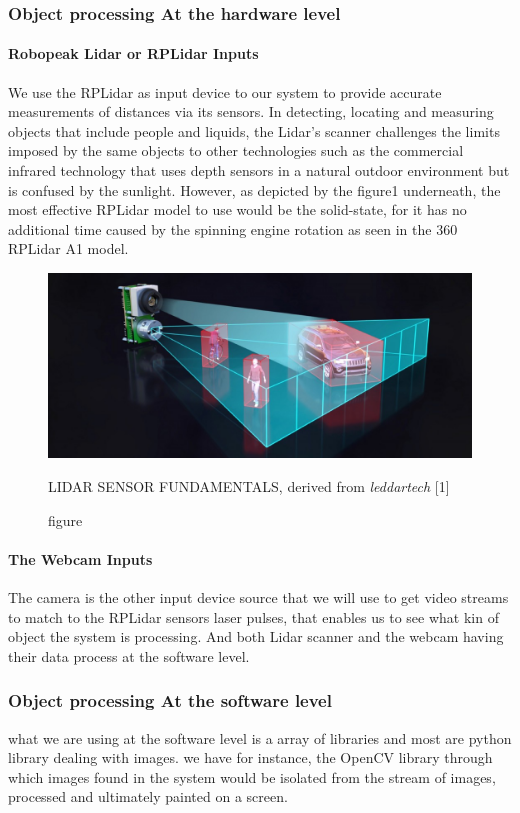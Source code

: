     	\subsubsection{Object processing At the hardware level}
    	\paragraph{\textbf {Robopeak Lidar or RPLidar Inputs}} 	
    	We use the RPLidar as input device to our system to provide accurate measurements of distances via its sensors. In detecting, locating and measuring objects that include people and liquids, the Lidar's scanner challenges the limits imposed by the same objects to other technologies such as the commercial infrared technology that uses  depth sensors in a natural outdoor environment but is confused by the sunlight. However, as depicted by the figure1 underneath, the most effective RPLidar model to use would be the solid-state, for it has no additional time caused by the spinning engine rotation as seen in the 360 RPLidar A1 model.
    	\\[2ex]
    	\begin{figure}[ht]
    	 \centering \includegraphics[scale=.5]{images/LiDAR-fundamentals-2-1024x449.eps}
    	\caption{figure}{LIDAR SENSOR FUNDAMENTALS, derived from  \textit{leddartech} }[1]\label{rplidar2}
    	\end{figure}
    	\paragraph{\textbf{The Webcam Inputs} }
    The camera is the other input device source that we will use to get video streams to match to the RPLidar sensors laser pulses, that enables us to  see what kin of object the system is processing. And both Lidar scanner and the webcam having their data process at the software level.
   
    	\subsubsection{Object processing At the software level}
    	what we are using at the software level is a array of libraries and most are python library dealing with images. we have for instance, the OpenCV library through which images found in the system would be isolated from the stream of images, processed and ultimately painted on a screen.
    	
